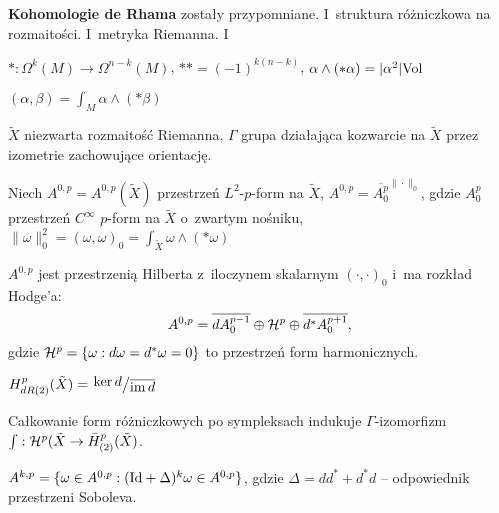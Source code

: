 

 


{\bf Kohomologie de Rhama} zostały przypomniane.
I~struktura różniczkowa na rozmaitości.
I~metryka Riemanna. I
\begin{definicja}
	$\ast: \Omega^k(M) \to \Omega^{n-k}(M)$, 
	${\ast \ast = (-1)^{k(n-k)}}$,
	${\alpha \wedge (\ast \alpha) = |\alpha^2| {\mathrm{Vol}}}$
\end{definicja}

\begin{definicja}
	$(\alpha, \beta) = \int_M \alpha \wedge (\ast \beta)$
\end{definicja}

\begin{definicja}
	$\tilde{X}$ niezwarta rozmaitość Riemanna,
	$\Gamma$ grupa działająca kozwarcie na $\tilde{X}$ przez
	izometrie zachowujące orientację.
	
	Niech $A^{0,p} = A^{0,p}(\tilde{X})$ przestrzeń $L^2$-$p$-form
	na $\tilde{X}$, ${A^{0,p} = \overline{A_0^p}^{\| \cdot \|_0}}$,
	gdzie $A_0^p$ przestrzeń $C^\infty$ $p$-form na $\tilde{X}$
	o~zwartym nośniku,
	$\| \omega \|_0^2 = (\omega, \omega)_0 
	= {\int_{\tilde{X}} \omega \wedge (\ast \omega)}$
\end{definicja}

\begin{stwierdzenie}
	$A^{0,p}$ jest przestrzenią Hilberta z~iloczynem skalarnym
	$(\cdot, \cdot)_0$ i~ma rozkład Hodge'a:
	$$A^{0,p} = \overline{d A_0^{p-1}} \oplus {\mathcal{H}}^p \oplus 
	\overline{d^\ast A_0^{p+1}},$$
	gdzie ${\mathcal{H}}^p = \{ \omega: d \omega = d^\ast \omega = 0\}$ 
	to przestrzeń form harmonicznych.
\end{stwierdzenie}

\begin{definicja}
	$H_{dR(2)}^p(\tilde{X}) = \bigslant{\ker d}{\overline{\im d}}$
\end{definicja}

\begin{twierdzenie}[Dodziuk 1977]
	Całkowanie form różniczkowych po sympleksach indukuje
	$\Gamma$-izomorfizm $\int: {\mathcal{H}}^p(\tilde{X} 
	\to \bar{H}_{(2)}^p(\tilde{X})$.
\end{twierdzenie}

\begin{definicja}
	$A^{k,p} = \{ \omega \in A^{0,p} : ({\mathrm{Id}} + \Delta)^k \omega
	\in A^{0,p} \}$, gdzie $\Delta = d d^\ast + d^\ast d$
	-- odpowiednik przestrzeni Soboleva.
\end{definicja}

